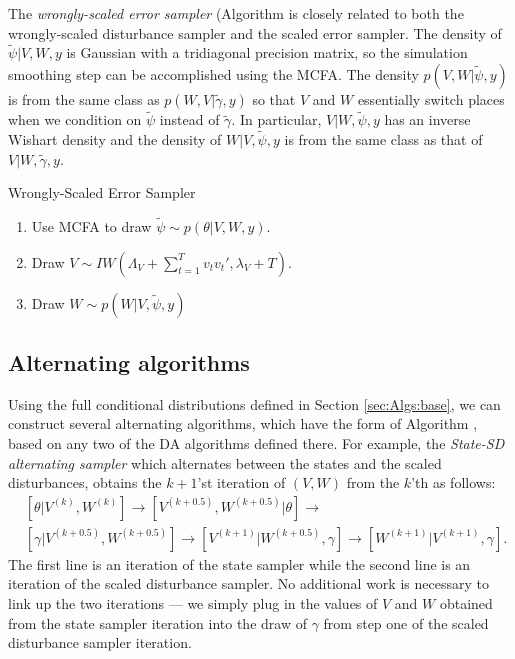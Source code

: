 \documentclass[12pt]{article}
\begin{document}
The {\it wrongly-scaled error sampler} (Algorithm  is closely related to both the wrongly-scaled disturbance sampler and the scaled error sampler. The density of $\tilde{\psi}|V,W,y$ is Gaussian with a tridiagonal precision matrix, so the simulation smoothing step can be accomplished using the MCFA. The density $p(V,W|\tilde{\psi},y)$ is from the same class as $p(W,V|\tilde{\gamma},y)$ so that $V$ and $W$ essentially switch places when we condition on $\tilde{\psi}$ instead of $\tilde{\gamma}$. In particular, $V|W,\tilde{\psi},y$ has an inverse Wishart density and the density of $W|V,\tilde{\psi},y$ is from the same class as that of $V|W,\tilde{\gamma},y$.
\begin{alg*}[WSE]Wrongly-Scaled Error Sampler\label{alg:DLMwerror}
\begin{enumerate}
\item Use MCFA to draw $\tilde{\psi} \sim p(\theta|V,W,y)$.
\item Draw $V \sim IW\left(\Lambda_V + \sum_{t=1}^Tv_tv_t',\lambda_V + T\right)$.
\item Draw $W \sim p(W|V,\tilde{\psi},y)$
\end{enumerate}
\end{alg*}


\subsection{Alternating algorithms}\label{sec:Algs:alt}
Using the full conditional distributions defined in Section \ref{sec:Algs:base}, we can construct several alternating algorithms, which have the form of Algorithm , based on any two of the DA algorithms defined there. For example, the {\it State-SD alternating sampler} which alternates between the states and the scaled disturbances, obtains the $k+1$'st iteration of $(V,W)$ from the $k$'th as follows:
\begin{align*}
&[\theta|V^{(k)},W^{(k)}] \to [V^{(k+0.5)},W^{(k+0.5)}|\theta] \to\\
&[\gamma|V^{(k+0.5)},W^{(k+0.5)}] \to [V^{(k+1)}|W^{(k+0.5)},\gamma] \to [W^{(k+1)}|V^{(k+1)},\gamma].
\end{align*}
The first line is an iteration of the state sampler while the second line is an iteration of the scaled disturbance sampler. No additional work is necessary to link up the two iterations --- we simply plug in the values of $V$ and $W$ obtained from the state sampler iteration into the draw of $\gamma$ from step one of the scaled disturbance sampler iteration.
\end{document}
